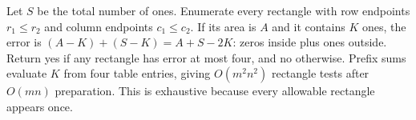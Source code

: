 Let $S$ be the total number of ones. Enumerate every rectangle with row endpoints $r_1\le r_2$ and column endpoints $c_1\le c_2$. If its area is $A$ and it contains $K$ ones, the error is $(A-K)+(S-K)=A+S-2K$: zeros inside plus ones outside. Return yes if any rectangle has error at most four, and no otherwise. Prefix sums evaluate $K$ from four table entries, giving $O(m^2n^2)$ rectangle tests after $O(mn)$ preparation. This is exhaustive because every allowable rectangle appears once.
